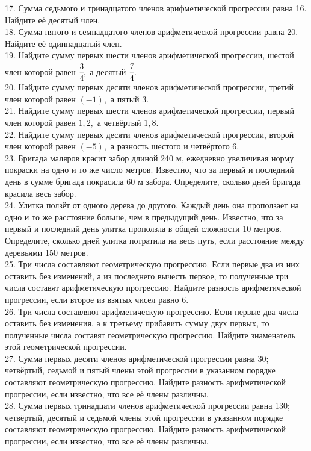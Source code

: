 17. Сумма седьмого и тринадцатого членов арифметической прогрессии равна 16. Найдите её десятый член.\\
18. Сумма пятого и семнадцатого членов арифметической прогрессии равна 20. Найдите её одиннадцатый член.\\
19. Найдите сумму первых шести членов арифметической прогрессии, шестой член которой равен $\cfrac{3}{4},$ а десятый $\cfrac{7}{4}.$\\
20. Найдите сумму первых десяти членов арифметической прогрессии, третий член которой равен $(-1),$ а пятый $3.$\\
21. Найдите сумму первых шести членов арифметической прогрессии, первый член которой равен $1,2,$ а четвёртый $1,8.$\\
22. Найдите сумму первых десяти членов арифметической прогрессии, второй член которой равен $(-5),$ а разность шестого и четвёртого $6.$\\
23. Бригада маляров красит забор длиной 240 м, ежедневно увеличивая норму покраски на одно и то же число метров. Известно, что за первый и последний день в сумме бригада покрасила 60 м забора. Определите, сколько дней бригада красила весь забор.\\
24. Улитка ползёт от одного дерева до другого. Каждый день она проползает на одно и то же расстояние больше, чем в предыдущий день. Известно, что за первый и последний день улитка проползла в общей сложности 10 метров. Определите, сколько дней улитка потратила на весь путь, если расстояние между деревьями 150 метров.\\
25. Три числа составляют геометрическую прогрессию. Если первые два из них оставить без изменений, а из последнего вычесть первое, то полученные три числа составят арифметическую прогрессию. Найдите разность арифметической прогрессии, если второе из взятых чисел равно 6.\\
26. Три числа составляют арифметическую прогрессию. Если первые два числа оставить без изменения, а к третьему прибавить сумму двух первых, то полученные числа составят геометрическую прогрессию. Найдите знаменатель этой геометрической прогрессии.\\
27. Сумма первых десяти членов арифметической прогрессии равна 30; четвёртый, седьмой и пятый члены этой прогрессии в указанном порядке составляют геометрическую прогрессию. Найдите разность арифметической прогрессии, если известно, что все её члены различны.\\
28. Сумма первых тринадцати членов арифметической прогрессии равна 130; четвёртый, десятый и седьмой члены этой прогрессии в указанном порядке составляют геометрическую прогрессию. Найдите разность арифметической прогрессии, если известно, что все её члены различны.\\
